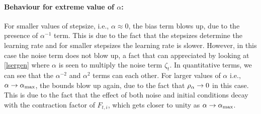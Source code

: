 \paragraph{Behaviour for extreme value of $\alpha$:} For smaller values of stepsize, i.e., $\alpha\approx 0$, the bias term blows up, due to the presence of $\alpha^{-1}$ term. This is due to the fact that the stepsizes determine the learning rate and for smaller stepsizes the learning rate is slower. However, in this case the noise term does not blow up, a fact that can appreciated by looking at \eqref{lsergen} where $\alpha$ is seen to multiply the noise term $\zeta_t$. In quantitative terms, we can see that the $\alpha^{-2}$ and $\alpha^2$ terms can each other. For larger values of $\alpha$ i.e., $\alpha\rightarrow \alpha_{\max}$, the bounds blow up again, due to the fact that $\rho_{\alpha}\rightarrow 0$ in this case. This is due to the fact that the effect of both noise and initial conditions decay with the contraction factor of $F_{t,i}$, which gets closer to unity as $\alpha\rightarrow\alpha_{\max}$.


